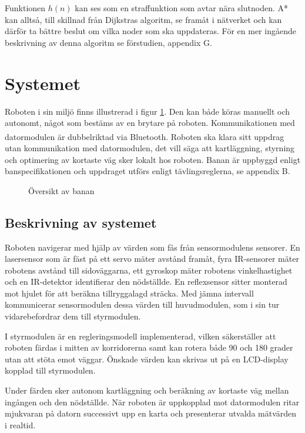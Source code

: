 \documentclass[11pt]{article}
\begin{document}
\begin{flushleft}
Funktionen $h(n)$ kan ses som en straffunktion som avtar nära slutnoden. A* kan alltså, till skillnad från Dijkstras algoritm, se framåt i nätverket och kan därför ta bättre beslut om vilka noder som ska uppdateras. För en mer ingående beskrivning av denna algoritm se förstudien, appendix G.

\pagebreak

\section{Systemet}
Roboten i sin miljö finns illustrerad i figur \ref{system}. Den kan både köras manuellt och autonomt, något som bestäms av en brytare på roboten. Kommunikationen med datormodulen är dubbelriktad via Bluetooth\textsuperscript{\circledR}. Roboten ska klara sitt uppdrag utan kommunikation med datormodulen, det vill säga att kartläggning, styrning och optimering av kortaste väg sker lokalt hos roboten. Banan är uppbyggd enligt banspecifikationen och uppdraget utförs enligt tävlingsreglerna, se appendix B.

\begin{figure}[htbp]
\centering
\noindent\resizebox{.8\linewidth}{!}{
	}
	\caption{Översikt av banan\label{system}}	
\end{figure}

\subsection{Beskrivning av systemet}

Roboten navigerar med hjälp av värden som fås från sensormodulens sensorer. En lasersensor som är fäst på ett servo mäter avstånd framåt, fyra IR-sensorer mäter robotens avstånd till sidoväggarna, ett gyroskop mäter robotens vinkelhastighet och en IR-detektor identifierar den nödställde. En reflexsensor sitter monterad mot hjulet för att beräkna tillryggalagd sträcka. Med jämna intervall kommunicerar sensormodulen dessa värden till huvudmodulen, som i sin tur vidarebefordrar dem till styrmodulen. 


I styrmodulen är en regleringsmodell implementerad, vilken säkerställer att roboten färdas i mitten av korridorerna samt kan rotera både 90 och 180 grader utan att stöta emot väggar. Önskade värden kan skrivas ut på en LCD-display kopplad till styrmodulen.

Under färden sker autonom kartläggning och beräkning av kortaste väg mellan ingången och den nödställde. När roboten är uppkopplad mot datormodulen ritar mjukvaran på datorn successivt upp en karta och presenterar utvalda mätvärden i realtid. 


\end{flushleft}
\end{document}
